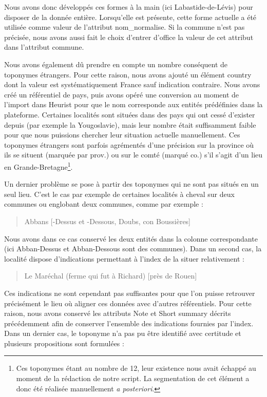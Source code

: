 \documentclass[a4paper,12pt,twoside]{book}
\begin{document}
	\noindent Nous avons donc développés ces formes à la main (ici \og Labastide-de-Lévis\fg{}) pour disposer de la donnée entière. Lorsqu'elle est présente, cette forme actuelle a été utilisée comme valeur de l'attribut \og nom\_normalise\fg{}. Si la commune n'est pas précisée, nous avons aussi fait le choix d'entrer d'office la valeur de cet attribut dans l'attribut \og commune\fg{}.
	
	Nous avons également dû prendre en compte un nombre conséquent de toponymes étrangers. Pour cette raison, nous avons ajouté un élément \og country\fg{} dont la valeur est systématiquement \og France\fg{} sauf indication contraire. Nous avons créé un référentiel de pays, puis avons opéré une conversion au moment de l'import dans Heurist pour que le nom corresponde aux entités prédéfinies dans la plateforme. Certaines localités sont situées dans des pays qui ont cessé d'exister depuis (par exemple la Yougoslavie), mais leur nombre était suffisamment faible pour que nous puissions chercher leur situation actuelle manuellement. Ces toponymes étrangers sont parfois agrémentés d'une précision sur la province où ils se situent (marquée par \og prov.\fg{}) ou sur le comté (marqué \og co.\fg{}) s'il s'agit d'un lieu en Grande-Bretagne\footnote{Ces toponymes étant au nombre de 12, leur existence nous avait échappé au moment de la rédaction de notre script. La segmentation de cet élément a donc été réalisée manuellement \textit{a posteriori}.}.
	
	Un dernier problème se pose à partir des toponymes qui ne sont pas situés en un seul lieu. C'est le cas par exemple de certaines localités à cheval sur deux communes ou englobant deux communes, comme par exemple :
	
	\begin{quotation}
		Abbans [-Dessus et -Dessous, Doubs, con Boussières]
	\end{quotation}
	
	\noindent Nous avons dans ce cas conservé les deux entités dans la colonne correspondante (ici \og Abban-Dessus\fg{} et \og Abban-Dessous\fg{} sont des communes). Dans un second cas, la localité dispose d'indications permettant à l'index de la situer relativement :
	
	\begin{quotation}
		Le Maréchal (ferme qui fut à Richard) [près de Rouen]
	\end{quotation}
	
	\noindent Ces indications ne sont cependant pas suffisantes pour que l'on puisse retrouver précisément le lieu où aligner ces données avec d'autres référentiels. Pour cette raison, nous avons conservé les attributs \og Note\fg{} et \og Short summary\fg{} décrits précédemment afin de conserver l'ensemble des indications fournies par l'index. Dans un dernier cas, le toponyme n'a pas pu être identifié avec certitude et plusieurs propositions sont formulées :
	
\end{document}
